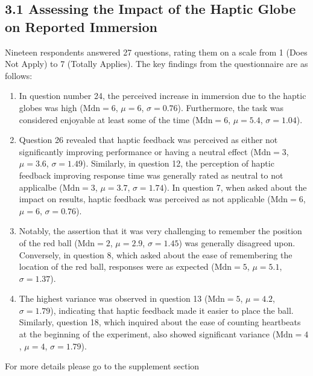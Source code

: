 \documentclass[12pt,oneside,openright]{report}
\begin{document}
\subsection*{3.1 Assessing the Impact of the Haptic Globe on Reported Immersion}
    
    Nineteen respondents answered 27 questions, rating them on a scale from 1 (Does Not Apply) to 7 (Totally Applies). The key findings from the questionnaire are as follows:
    
    \begin{enumerate}
        \item In question number 24, the perceived increase in immersion due to the haptic globes was high ($\text{Mdn} = 6$, $\mu = 6$, $\sigma = 0.76$). Furthermore, the task was considered enjoyable at least some of the time ($\text{Mdn} = 6$, $\mu = 5.4$, $\sigma = 1.04$).
        
        \item Question 26 revealed that haptic feedback was perceived as either not significantly improving performance or having a neutral effect ($\text{Mdn} = 3$, $\mu = 3.6$, $\sigma = 1.49$). Similarly, in question 12, the perception of haptic feedback improving response time was generally rated as neutral to not applicalbe ($\text{Mdn} = 3$, $\mu = 3.7$, $\sigma = 1.74$). In question 7, when asked about the impact on results, haptic feedback was perceived as not applicable ($\text{Mdn} = 6$, $\mu = 6$, $\sigma = 0.76$).
    
        \item Notably, the assertion that it was very challenging to remember the position of the red ball ($\text{Mdn} = 2$, $\mu = 2.9$, $\sigma = 1.45$) was generally disagreed upon. Conversely, in question 8, which asked about the ease of remembering the location of the red ball, responses were as expected ($\text{Mdn} = 5$, $\mu = 5.1$, $\sigma = 1.37$).
    
        \item The highest variance was observed in question 13 ($\text{Mdn} = 5$, $\mu = 4.2$, $\sigma = 1.79$), indicating that haptic feedback made it easier to place the ball. Similarly, question 18, which inquired about the ease of counting heartbeats at the beginning of the experiment, also showed significant variance ($\text{Mdn} = 4$, $\mu = 4$, $\sigma = 1.79$). 
        
    \end{enumerate}
    
    For more details please go to the supplement section 
\end{document}

